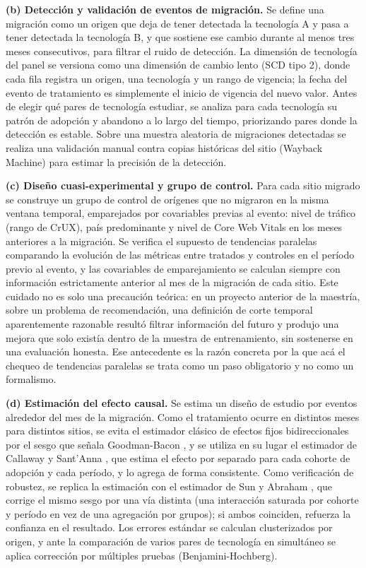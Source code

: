 \documentclass[12pt, a4paper]{article}
\begin{document}
\textbf{(b) Detección y validación de eventos de migración.} Se define una migración como un origen que deja de tener detectada la tecnología A y pasa a tener detectada la tecnología B, y que sostiene ese cambio durante al menos tres meses consecutivos, para filtrar el ruido de detección. La dimensión de tecnología del panel se versiona como una dimensión de cambio lento (SCD tipo 2), donde cada fila registra un origen, una tecnología y un rango de vigencia; la fecha del evento de tratamiento es simplemente el inicio de vigencia del nuevo valor. Antes de elegir qué pares de tecnología estudiar, se analiza para cada tecnología su patrón de adopción y abandono a lo largo del tiempo, priorizando pares donde la detección es estable. Sobre una muestra aleatoria de migraciones detectadas se realiza una validación manual contra copias históricas del sitio (Wayback Machine) para estimar la precisión de la detección.

\textbf{(c) Diseño cuasi-experimental y grupo de control.} Para cada sitio migrado se construye un grupo de control de orígenes que no migraron en la misma ventana temporal, emparejados por covariables previas al evento: nivel de tráfico (rango de CrUX), país predominante y nivel de Core Web Vitals en los meses anteriores a la migración. Se verifica el supuesto de tendencias paralelas comparando la evolución de las métricas entre tratados y controles en el período previo al evento, y las covariables de emparejamiento se calculan siempre con información estrictamente anterior al mes de la migración de cada sitio. Este cuidado no es solo una precaución teórica: en un proyecto anterior de la maestría, sobre un problema de recomendación, una definición de corte temporal aparentemente razonable resultó filtrar información del futuro y produjo una mejora que solo existía dentro de la muestra de entrenamiento, sin sostenerse en una evaluación honesta. Ese antecedente es la razón concreta por la que acá el chequeo de tendencias paralelas se trata como un paso obligatorio y no como un formalismo.

\textbf{(d) Estimación del efecto causal.} Se estima un diseño de estudio por eventos alrededor del mes de la migración. Como el tratamiento ocurre en distintos meses para distintos sitios, se evita el estimador clásico de efectos fijos bidireccionales por el sesgo que señala Goodman-Bacon \cite{goodmanbacon2021}, y se utiliza en su lugar el estimador de Callaway y Sant'Anna \cite{callawaysantanna2021}, que estima el efecto por separado para cada cohorte de adopción y cada período, y lo agrega de forma consistente. Como verificación de robustez, se replica la estimación con el estimador de Sun y Abraham \cite{sunabraham2021}, que corrige el mismo sesgo por una vía distinta (una interacción saturada por cohorte y período en vez de una agregación por grupos); si ambos coinciden, refuerza la confianza en el resultado. Los errores estándar se calculan clusterizados por origen, y ante la comparación de varios pares de tecnología en simultáneo se aplica corrección por múltiples pruebas (Benjamini-Hochberg).
\end{document}
